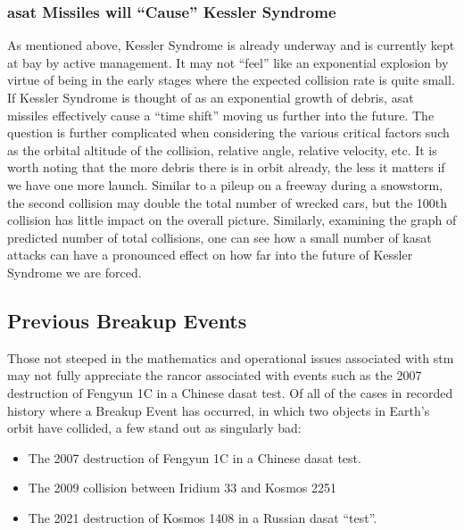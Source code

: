 \subsubsection{\ac{asat} Missiles will ``Cause'' Kessler Syndrome}
As mentioned above, Kessler Syndrome is already underway and is
currently kept at bay by active management.  It may not ``feel'' like
an exponential explosion by virtue of being in the early stages where
the expected collision rate is quite small.\cite[p2]{kessler-reunion}
If Kessler Syndrome is thought of as an exponential growth of debris,
\ac{asat} missiles effectively cause a ``time shift'' moving us
further into the future.\cite[p10]{kessler-reunion} The question is
further complicated when considering the various critical factors such
as the orbital altitude of the collision, relative angle, relative
velocity, etc.  It is worth noting that the more debris there is in
orbit already, the less it matters if we have one more launch.
Similar to a pileup on a freeway during a snowstorm, the second
collision may double the total number of wrecked cars, but the 100th
collision has little impact on the overall picture.  Similarly,
examining the graph of predicted number of total
collisions\cite[p6]{kessler-reunion}, one can see how a small number
of \ac{kasat} attacks can have a pronounced effect on how far into the
future of Kessler Syndrome we are forced.

\subsection{Previous Breakup Events}

Those not steeped in the mathematics and operational issues associated
with \ac{stm} may not fully appreciate the rancor associated with
events such as the 2007 destruction of Fengyun 1C in a Chinese
\ac{dasat} test.  Of all of the cases in recorded history where a
Breakup Event has occurred, in which two objects in Earth's orbit have
collided, a few stand out as singularly bad:

\begin{itemize}

\item The 2007 destruction of Fengyun 1C in a Chinese \ac{dasat} test.

\item The 2009 collision between Iridium 33 and Kosmos 2251

\item The 2021 destruction of Kosmos 1408 in a Russian \ac{dasat} ``test''.

\end{itemize}

